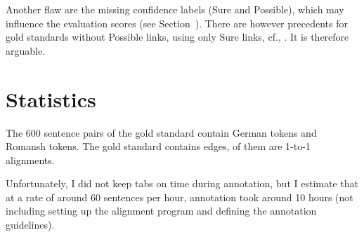 Another flaw are the missing confidence labels (Sure and Possible), which may influence the evaluation scores (see Section~). 
There are however precedents for gold standards without Possible links, using only Sure links, cf., \textcites{clematide2018,mihalcea-pedersen-2003-evaluation}. It is therefore arguable.



\section{Statistics}
The 600 sentence pairs of the gold standard contain  German tokens and  Romansh tokens. 
The gold standard contains  edges,  of them are 1-to-1 alignments.

Unfortunately, I did not keep tabs on time during annotation, but I  estimate that at a rate of around 60 sentences per hour, annotation took around 10 hours (not including setting up the alignment program and defining the annotation guidelines). 

